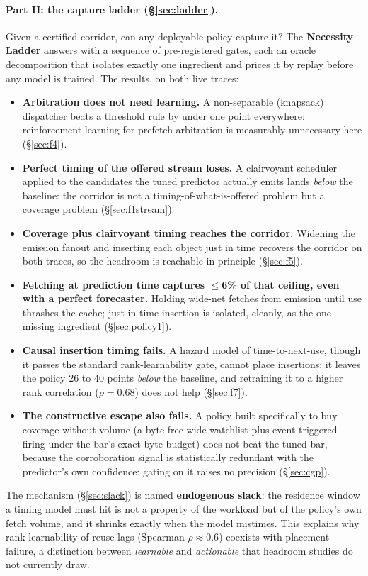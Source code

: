 \documentclass[11pt]{article}
\begin{document}
\paragraph{Part II: the capture ladder (\S\ref{sec:ladder}).} Given a certified corridor, can any deployable policy capture it? The \textbf{Necessity Ladder} answers with a sequence of pre-registered gates, each an oracle decomposition that isolates exactly one ingredient and prices it by replay before any model is trained. The results, on both live traces:
\begin{itemize}\itemsep0.1em
\item \textbf{Arbitration does not need learning.} A non-separable (knapsack) dispatcher beats a threshold rule by under one point everywhere: reinforcement learning for prefetch arbitration is measurably unnecessary here (\S\ref{sec:f4}).
\item \textbf{Perfect timing of the offered stream loses.} A clairvoyant scheduler applied to the candidates the tuned predictor actually emits lands \emph{below} the baseline: the corridor is not a timing-of-what-is-offered problem but a coverage problem (\S\ref{sec:f1stream}).
\item \textbf{Coverage plus clairvoyant timing reaches the corridor.} Widening the emission fanout and inserting each object just in time recovers the corridor on both traces, so the headroom is reachable in principle (\S\ref{sec:f5}).
\item \textbf{Fetching at prediction time captures $\leq$6\% of that ceiling, even with a perfect forecaster.} Holding wide-net fetches from emission until use thrashes the cache; just-in-time insertion is isolated, cleanly, as the one missing ingredient (\S\ref{sec:policy1}).
\item \textbf{Causal insertion timing fails.} A hazard model of time-to-next-use, though it passes the standard rank-learnability gate, cannot place insertions: it leaves the policy 26 to 40 points \emph{below} the baseline, and retraining it to a higher rank correlation ($\rho{=}0.68$) does not help (\S\ref{sec:f7}).
\item \textbf{The constructive escape also fails.} A policy built specifically to buy coverage without volume (a byte-free wide watchlist plus event-triggered firing under the bar's exact byte budget) does not beat the tuned bar, because the corroboration signal is statistically redundant with the predictor's own confidence: gating on it raises no precision (\S\ref{sec:cgp}).
\end{itemize}
The mechanism (\S\ref{sec:slack}) is named \textbf{endogenous slack}: the residence window a timing model must hit is not a property of the workload but of the policy's own fetch volume, and it shrinks exactly when the model mistimes. This explains why rank-learnability of reuse lags (Spearman $\rho\approx0.6$) coexists with placement failure, a distinction between \emph{learnable} and \emph{actionable} that headroom studies do not currently draw.
\end{document}
